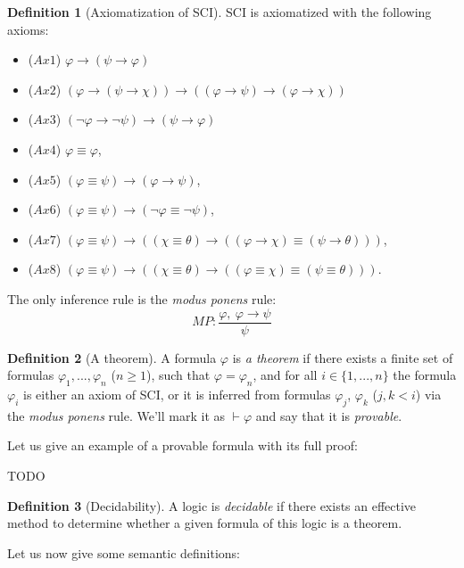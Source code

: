 \documentclass{article}
\theoremstyle{definition}
\newtheorem{definition}{Definition}[section]
\newcommand*{\id}{\equiv}
\newcommand*{\ra}{\rightarrow}
\begin{document}
\begin{definition}[Axiomatization of SCI]
    SCI is axiomatized with the following axioms:
    \begin{itemize}
        \item ($Ax1$) $\varphi \ra (\psi \ra \varphi)$
        \item ($Ax2$) $(\varphi \ra (\psi \ra \chi)) \ra ((\varphi \ra \psi) \ra (\varphi \ra \chi))$
        \item ($Ax3$) $(\lnot \varphi \ra \lnot \psi) \ra (\psi \ra \varphi)$
        \item ($Ax4$) $\varphi \id \varphi$,
        \item ($Ax5$) $(\varphi \id \psi) \ra (\varphi \ra \psi)$,
        \item ($Ax6$) $(\varphi \id \psi) \ra (\lnot \varphi \id \lnot \psi)$,
        \item ($Ax7$) $(\varphi \id \psi) \ra ((\chi \id \theta) \ra ((\varphi \ra \chi) \id (\psi \ra \theta)))$,
        \item ($Ax8$) $(\varphi \id \psi) \ra ((\chi \id \theta) \ra ((\varphi \id \chi) \id (\psi \id \theta)))$.
    \end{itemize}
    The only inference rule is the \emph{modus ponens} rule:
    $$
        MP: \frac{
            \varphi, \ \varphi \ra \psi}%
        { \psi }
    $$
\end{definition}

\begin{definition}[A theorem]
    A formula $\varphi$ is \emph{a theorem} if there exists a finite set of formulas $\varphi_1, ..., \varphi_n$ ($n \geq 1$), such that $\varphi = \varphi_n$, and for all $i \in \{1, ..., n\}$ the formula $\varphi_i$ is either an axiom of SCI, or it is inferred from formulas $\varphi_j$, $\varphi_k$ ($j, k <i$) via the \emph{modus ponens} rule. We'll mark it as $\vdash \varphi$ and say that it is \emph{provable}.
\end{definition}

Let us give an example of a provable formula with its full proof:

TODO

\begin{definition}[Decidability]
    A logic is \emph{decidable} if there exists an effective method to determine whether a given formula of this logic is a theorem.
\end{definition}

Let us now give some semantic definitions:
\end{document}
